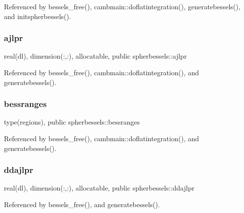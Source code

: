 Referenced by bessels\+\_\+free(), cambmain\+::doflatintegration(), generatebessels(), and initspherbessels().

\mbox{\label{namespacespherbessels_aafb6422b5aab90f84fdb3a955c129874}} 
\subsubsection{\texorpdfstring{ajlpr}{ajlpr}}
{\footnotesize\ttfamily real(dl), dimension(\+:,\+:), allocatable, public spherbessels\+::ajlpr}



Referenced by bessels\+\_\+free(), cambmain\+::doflatintegration(), and generatebessels().

\mbox{\label{namespacespherbessels_a3ae9c132f8c8a13f8d061492485272b8}} 
\subsubsection{\texorpdfstring{bessranges}{bessranges}}
{\footnotesize\ttfamily type(regions), public spherbessels\+::bessranges}



Referenced by bessels\+\_\+free(), cambmain\+::doflatintegration(), and generatebessels().

\mbox{\label{namespacespherbessels_a90a7acde21383c40c841e0a11e87526f}} 
\subsubsection{\texorpdfstring{ddajlpr}{ddajlpr}}
{\footnotesize\ttfamily real(dl), dimension(\+:,\+:), allocatable, public spherbessels\+::ddajlpr}



Referenced by bessels\+\_\+free(), and generatebessels().

\mbox{\label{namespacespherbessels_abe559ecdb38e3d5173cbf2c709b7a694}} 
